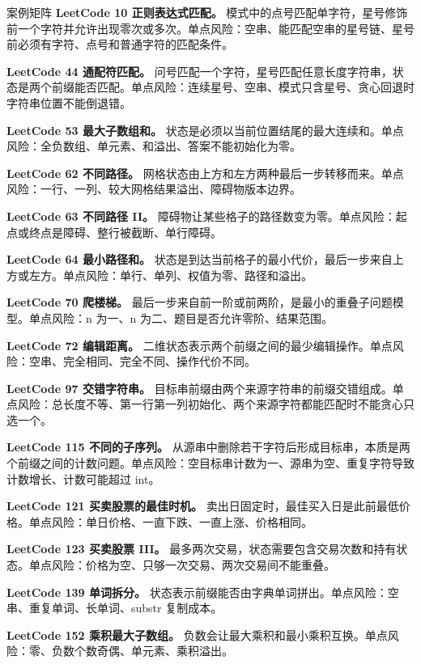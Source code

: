 \begin{principlebox}{案例矩阵}
\textbf{LeetCode 10 正则表达式匹配。}
模式中的点号匹配单字符，星号修饰前一个字符并允许出现零次或多次。单点风险：空串、能匹配空串的星号链、星号前必须有字符、点号和普通字符的匹配条件。

\textbf{LeetCode 44 通配符匹配。}
问号匹配一个字符，星号匹配任意长度字符串，状态是两个前缀能否匹配。单点风险：连续星号、空串、模式只含星号、贪心回退时字符串位置不能倒退错。

\textbf{LeetCode 53 最大子数组和。}
状态是必须以当前位置结尾的最大连续和。单点风险：全负数组、单元素、和溢出、答案不能初始化为零。

\textbf{LeetCode 62 不同路径。}
网格状态由上方和左方两种最后一步转移而来。单点风险：一行、一列、较大网格结果溢出、障碍物版本边界。

\textbf{LeetCode 63 不同路径 II。}
障碍物让某些格子的路径数变为零。单点风险：起点或终点是障碍、整行被截断、单行障碍。

\textbf{LeetCode 64 最小路径和。}
状态是到达当前格子的最小代价，最后一步来自上方或左方。单点风险：单行、单列、权值为零、路径和溢出。

\textbf{LeetCode 70 爬楼梯。}
最后一步来自前一阶或前两阶，是最小的重叠子问题模型。单点风险：n 为一、n 为二、题目是否允许零阶、结果范围。

\textbf{LeetCode 72 编辑距离。}
二维状态表示两个前缀之间的最少编辑操作。单点风险：空串、完全相同、完全不同、操作代价不同。

\textbf{LeetCode 97 交错字符串。}
目标串前缀由两个来源字符串的前缀交错组成。单点风险：总长度不等、第一行第一列初始化、两个来源字符都能匹配时不能贪心只选一个。

\textbf{LeetCode 115 不同的子序列。}
从源串中删除若干字符后形成目标串，本质是两个前缀之间的计数问题。单点风险：空目标串计数为一、源串为空、重复字符导致计数增长、计数可能超过 int。

\textbf{LeetCode 121 买卖股票的最佳时机。}
卖出日固定时，最佳买入日是此前最低价格。单点风险：单日价格、一直下跌、一直上涨、价格相同。

\textbf{LeetCode 123 买卖股票 III。}
最多两次交易，状态需要包含交易次数和持有状态。单点风险：价格为空、只够一次交易、两次交易间不能重叠。

\textbf{LeetCode 139 单词拆分。}
状态表示前缀能否由字典单词拼出。单点风险：空串、重复单词、长单词、substr 复制成本。

\textbf{LeetCode 152 乘积最大子数组。}
负数会让最大乘积和最小乘积互换。单点风险：零、负数个数奇偶、单元素、乘积溢出。


\end{principlebox}
